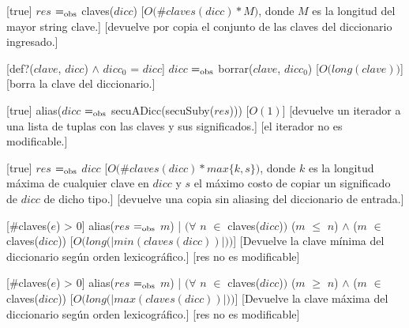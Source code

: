 \begin{Interfaz}
  [true]
  {$res$ $=_{\mathrm{obs}}$ claves($dicc$)}
  [$O\big(\#claves(dicc) * M\big)$, donde $M$ es la longitud del mayor string clave.]
  [devuelve por copia el conjunto de las claves del diccionario ingresado.]

  [def?($clave$, $dicc$) $\land$ $dicc_0$ = $dicc$]
  {$dicc$ $=_{\mathrm{obs}}$ borrar($clave$, $dicc_0$)}
  [$O\big(long(clave)\big)$]
  [borra la clave del diccionario.]

  [true]
  {alias\big($dicc$ $=_{\mathrm{obs}}$ secuADicc\big(secuSuby($res$)\big)\big)}
  [$O(1)$]
  [devuelve un iterador a una lista de tuplas con las claves y sus significados.]
  [el iterador no es modificable.]


  [true]
  {$res$ $=_{\mathrm{obs}}$ $dicc$}
  [$O\big(\#claves(dicc) * max\{k, s\}\big)$, donde $k$ es la longitud máxima de cualquier clave en $dicc$ y $s$ el máximo costo de copiar un significado de $dicc$ de dicho tipo.]
  [devuelve una copia sin aliasing del diccionario de entrada.]

  [\#claves($e$) > 0]
  {alias($res$ $=_{\mathrm{obs}}$ $m$) | $\big(\forall$ $n$ $\in$ claves($dicc$)$\big)$ ($m$ $\le$ $n$) $\land$ ($m$ $\in$ claves($dicc$))}
  [$O\big(long\big(|min(claves(dicc))|\big)\big)$]
  [Devuelve la clave mínima del diccionario según orden lexicográfico.]
  [res no es modificable]

  [\#claves($e$) > 0]
  {alias($res$ $=_{\mathrm{obs}}$ $m$) | $\big(\forall$ $n$ $\in$ claves($dicc$)$\big)$ ($m$ $\ge$ $n$) $\land$ ($m$ $\in$ claves($dicc$))}
  [$O\big(long\big(|max(claves(dicc))|\big)\big)$]
  [Devuelve la clave máxima del diccionario según orden lexicográfico.]
  [res no es modificable]

\end{Interfaz}


